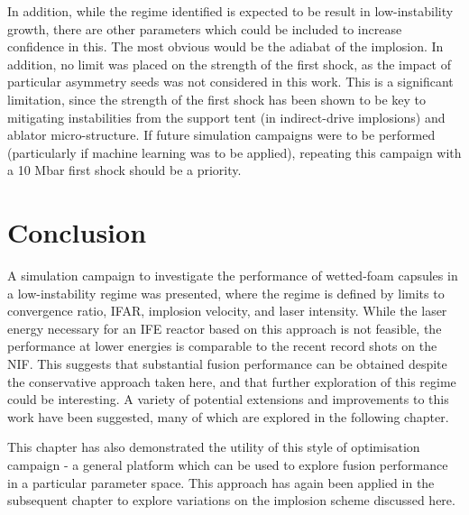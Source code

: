 In addition, while the regime identified is expected to be result in low-instability growth, there are other parameters which could be included to increase confidence in this. The most obvious would be the adiabat of the implosion. In addition, no limit was placed on the strength of the first shock, as the impact of particular asymmetry seeds was not considered in this work. This is a significant limitation, since the strength of the first shock has been shown to be key to mitigating instabilities from the support tent (in indirect-drive implosions) and ablator micro-structure. If future simulation campaigns were to be performed (particularly if machine learning was to be applied), repeating this campaign with a 10 Mbar first shock should be a priority.

\section{Conclusion} \label{sec:LowCRConclusions}
A simulation campaign to investigate the performance of wetted-foam capsules in a low-instability regime was presented, where the regime is defined by limits to convergence ratio, IFAR, implosion velocity, and laser intensity. While the laser energy necessary for an IFE reactor based on this approach is not feasible, the performance at lower energies is comparable to the recent record shots on the NIF. This suggests that substantial fusion performance can be obtained despite the conservative approach taken here, and that further exploration of this regime could be interesting. A variety of potential extensions and improvements to this work have been suggested, many of which are explored in the following chapter.

This chapter has also demonstrated the utility of this style of optimisation campaign - a general platform which can be used to explore fusion performance in a particular parameter space. This approach has again been applied in the subsequent chapter to explore variations on the implosion scheme discussed here.






















